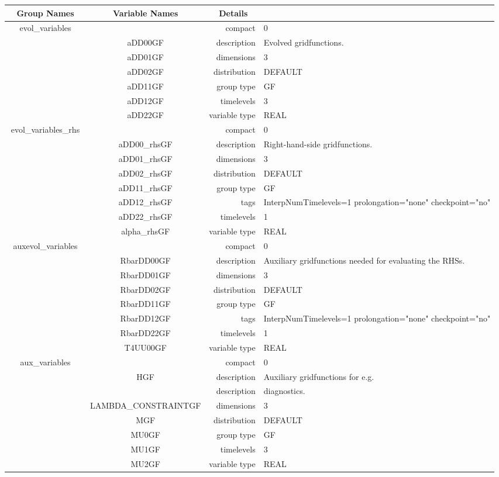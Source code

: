 \begin{tabular*}{150mm}{|c|c@{\extracolsep{\fill}}|rl|} \hline 
~ {\bf Group Names} ~ & ~ {\bf Variable Names} ~  &{\bf Details} ~ & ~\\ 
\hline 
evol\_variables &  & compact & 0 \\ 
 & aDD00GF & description & Evolved gridfunctions. \\ 
 & aDD01GF & dimensions & 3 \\ 
 & aDD02GF & distribution & DEFAULT \\ 
 & aDD11GF & group type & GF \\ 
 & aDD12GF & timelevels & 3 \\ 
 & aDD22GF & variable type & REAL \\ 
\hline 
evol\_variables\_rhs &  & compact & 0 \\ 
 & aDD00\_rhsGF & description & Right-hand-side gridfunctions. \\ 
 & aDD01\_rhsGF & dimensions & 3 \\ 
 & aDD02\_rhsGF & distribution & DEFAULT \\ 
 & aDD11\_rhsGF & group type & GF \\ 
 & aDD12\_rhsGF & tags & InterpNumTimelevels=1 prolongation="none" checkpoint="no" \\ 
 & aDD22\_rhsGF & timelevels & 1 \\ 
 & alpha\_rhsGF & variable type & REAL \\ 
\hline 
auxevol\_variables &  & compact & 0 \\ 
 & RbarDD00GF & description & Auxiliary gridfunctions needed for evaluating the RHSs. \\ 
 & RbarDD01GF & dimensions & 3 \\ 
 & RbarDD02GF & distribution & DEFAULT \\ 
 & RbarDD11GF & group type & GF \\ 
 & RbarDD12GF & tags & InterpNumTimelevels=1 prolongation="none" checkpoint="no" \\ 
 & RbarDD22GF & timelevels & 1 \\ 
 & T4UU00GF & variable type & REAL \\ 
\hline 
aux\_variables &  & compact & 0 \\ 
 & HGF & description & Auxiliary gridfunctions for e.g. \\ 
& ~ & description &  diagnostics. \\ 
 & LAMBDA\_CONSTRAINTGF & dimensions & 3 \\ 
 & MGF & distribution & DEFAULT \\ 
 & MU0GF & group type & GF \\ 
 & MU1GF & timelevels & 3 \\ 
 & MU2GF & variable type & REAL \\ 
\hline 
\end{tabular*} 




